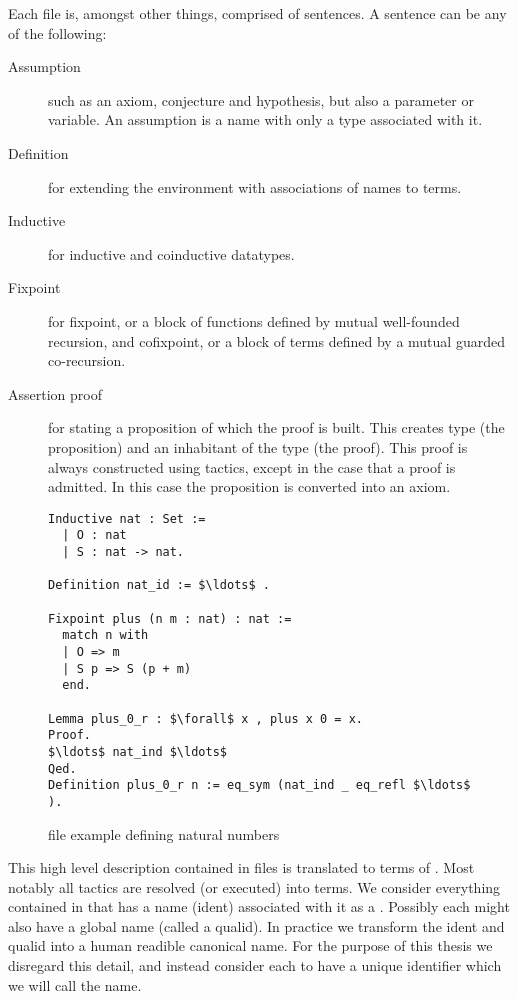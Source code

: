 Each file is, amongst other things, comprised of sentences.
A sentence can be any of the following:
\begin{description}
	\item[Assumption] such as an axiom, conjecture and hypothesis, but also a parameter or variable.
		An assumption is a name with only a type associated with it.
	\item[Definition] for extending the environment with associations of names to terms.
	\item[Inductive] for inductive and coinductive datatypes.
	\item[Fixpoint] for fixpoint, or a block of functions defined by mutual well-founded recursion, and cofixpoint, or a block of terms defined by a mutual guarded co-recursion.
	\item[Assertion proof] for stating a proposition of which the proof is built.
		This creates type (the proposition) and an inhabitant of the type (the proof).
		This proof is always constructed using tactics, except in the case that a proof is admitted.
		In this case the proposition is converted into an axiom.
\end{description}

\begin{figure}[H]
	\begin{lstlisting}[language=Coq, mathescape]
Inductive nat : Set :=
  | O : nat
  | S : nat -> nat.

Definition nat_id := $\ldots$ .

Fixpoint plus (n m : nat) : nat :=
  match n with
  | O => m
  | S p => S (p + m)
  end.

Lemma plus_0_r : $\forall$ x , plus x 0 = x.
Proof.
$\ldots$ nat_ind $\ldots$
Qed.
Definition plus_0_r n := eq_sym (nat_ind _ eq_refl $\ldots$ ).
	\end{lstlisting}
	\caption{\coq file example defining natural numbers}
\end{figure}

This high level description contained in \coq files is translated to terms of \pcic.
Most notably all tactics are resolved (or executed) into terms.
We consider everything contained in \pcic that has a name (ident) associated with it as a \coqobj.
Possibly each \coqobj might also have a global name (called a qualid).
In practice we transform the ident and qualid into a human readible canonical name.
For the purpose of this thesis we disregard this detail, and instead consider each \coqobj to have a unique identifier which we will call the name.

